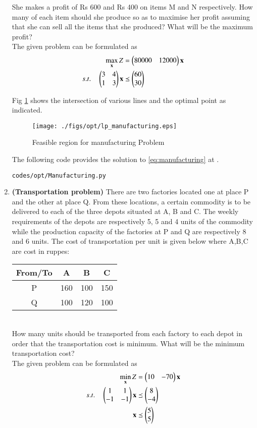 \begin{enumerate}[label=\arabic*.,ref=\thesection.\theenumi]
\begin{tabular}{|c|c|c|c|}
\end{tabular}

She makes a profit of Rs 600 and Rs 400 on items M and N respectively. How many
of each item should she produce so as to maximise her profit assuming that she can sell
all the items that she produced? What will be the maximum profit?
\\
\solution The given problem can be formulated as
\begin{align}
\max_{\mathbf{x}} Z &= \begin{pmatrix}80000&12000\end{pmatrix}\mathbf{x}
\\
s.t. \quad 
\begin{pmatrix}
3 & 4
\\
1 & 3
\end{pmatrix}
\mathbf{x} & \preceq \begin{pmatrix}60\\30\end{pmatrix}
\label{eq:manufacturing}
\end{align}

Fig  \ref{fig:manufacturing}
shows the intersection of various lines and the optimal point as indicated.
\begin{figure}[h]
\texttt{[image: ./figs/opt/lp\_manufacturing.eps]}
\caption{Feasible region for manufacturing Problem}
\caption{}
\label{fig:manufacturing}
\end{figure}

The following code provides the solution to \eqref{eq:manufacturing} at .
%
\begin{lstlisting}
codes/opt/Manufacturing.py
\end{lstlisting}

\item \textbf{(Transportation problem)} There are two factories located one at
place P and the other at place Q. From these locations, a certain commodity is to be
delivered to each of the three depots situated at A, B and C. The weekly requirements
of the depots are respectively 5, 5 and 4 units of the commodity while the production
capacity of the factories at P and Q are respectively 8 and 6 units. The cost of transportation per unit is given below where A,B,C are cost in ruppes:\\
\begin{tabular}{|c|c|c|c|}
\hline
From/To & A & B & C\\
\hline
P & 160 & 100 & 150\\
\hline
Q & 100 &120 & 100\\
\hline
\end{tabular}\\
How many units should be transported from each factory to each depot in order that
the transportation cost is minimum. What will be the minimum transportation cost?
\\
\solution The given problem can be formulated as
\begin{align}
\min_{\mathbf{x}} Z &= \begin{pmatrix}10 & -70\end{pmatrix}\mathbf{x}
\\
s.t. \quad 
\begin{pmatrix}
1 & 1
\\
-1 & -1
\end{pmatrix}
\mathbf{x} & \preceq \begin{pmatrix}8\\-4\end{pmatrix}
\\
\mathbf{x} &\preceq \begin{pmatrix}5\\5\end{pmatrix}
\label{eq:transport}
\end{align}


\end{enumerate}

